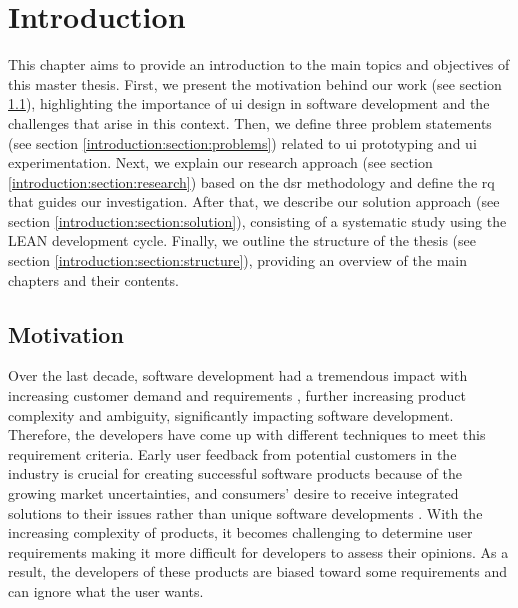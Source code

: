 
\chapter{Introduction}
\label{chap:introduction}
\ifpdf
    \graphicspath{{Chapters/Introduction/Figs/}{Chapters/Introduction/Figs/}{Chapters/Introduction/Figs/}}
\else
    \graphicspath{{Chapters/Introduction/Figs/}{Chapters/Introduction/Figs/}}
\fi
This chapter aims to provide an introduction to the main topics and objectives of this master thesis. 
First, we present the motivation behind our work (see section \ref{introduction:section:motivation}), highlighting the importance of \ac{ui} design in software development and the challenges that arise in this context.
Then, we define three problem statements (see section \ref{introduction:section:problems}) related to \ac{ui} prototyping and \ac{ui} experimentation. 
Next, we explain our research approach (see section \ref{introduction:section:research}) based on the \ac{dsr} methodology and define the \ac{rq} that guides our investigation. 
After that, we describe our solution approach (see section \ref{introduction:section:solution}), consisting of a systematic study using the LEAN development cycle. 
Finally, we outline the structure of the thesis (see section \ref{introduction:section:structure}), providing an overview of the main chapters and their contents.

\section{Motivation} %
\label{introduction:section:motivation}

Over the last decade, software development had a tremendous impact with increasing customer demand and requirements \cite{article:swdemand:ahmed}, further increasing product complexity and ambiguity, significantly impacting software development.  
Therefore, the developers have come up with different techniques to meet this requirement criteria.
Early user feedback from potential customers in the industry is crucial for creating successful software products because of the growing market uncertainties, and consumers' desire to receive integrated solutions to their issues rather than unique software developments \cite{misc:businessmodels:teece}.
With the increasing complexity of products, it becomes challenging to determine user requirements making it more difficult for developers to assess their opinions.
As a result, the developers of these products are biased toward some requirements and can ignore what the user wants. 

